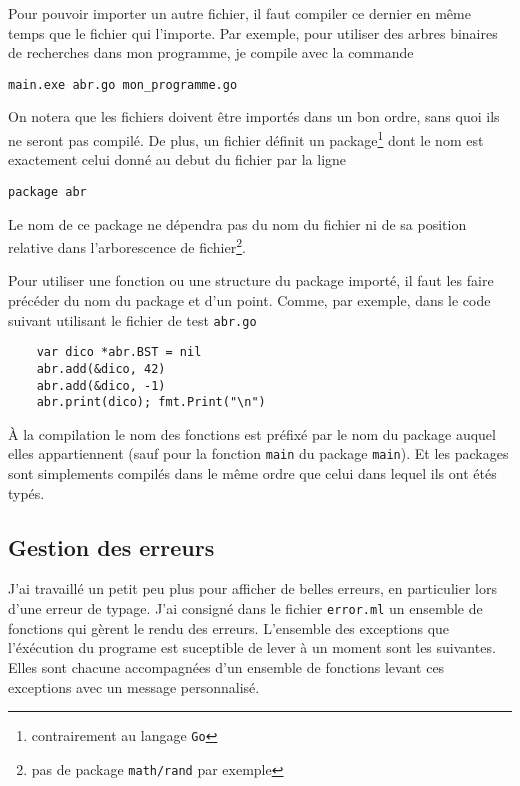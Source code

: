 \documentclass{article}
\begin{document}
Pour pouvoir importer un autre fichier, il faut compiler ce dernier en même temps que le fichier qui l'importe. Par exemple, pour utiliser des arbres binaires de recherches dans mon programme, je compile avec la commande

\begin{verbatim}
main.exe abr.go mon_programme.go
\end{verbatim}

On notera que les fichiers doivent être importés dans un bon ordre, sans quoi ils ne seront pas compilé. De plus, un fichier définit un package\footnote{contrairement au langage \texttt{Go}} dont le nom est exactement celui donné au debut du fichier par la ligne

\begin{verbatim}
package abr
\end{verbatim}

Le nom de ce package ne dépendra pas du nom du fichier ni de sa position relative dans l'arborescence de fichier\footnote{pas de package \texttt{math/rand} par exemple}.

Pour utiliser une fonction ou une structure du package importé, il faut les faire précéder du nom du package et d'un point. Comme, par exemple, dans le code suivant utilisant le fichier de test \texttt{abr.go}

\begin{verbatim}
    var dico *abr.BST = nil
    abr.add(&dico, 42)
    abr.add(&dico, -1)
    abr.print(dico); fmt.Print("\n")
\end{verbatim}

À la compilation le nom des fonctions est préfixé par le nom du package auquel elles appartiennent (sauf pour la fonction \texttt{main} du package \texttt{main}). Et les packages sont simplements compilés dans le même ordre que celui dans lequel ils ont étés typés.

\subsection{Gestion des erreurs\label{sec:errors}}

J'ai travaillé un petit peu plus pour afficher de belles erreurs, en particulier lors d'une erreur de typage. J'ai consigné dans le fichier \texttt{error.ml} un ensemble de fonctions qui gèrent le rendu des erreurs. L'ensemble des exceptions que l'éxécution du programe est suceptible de lever à un moment sont les suivantes. Elles sont chacune accompagnées d'un ensemble de fonctions levant ces exceptions avec un message personnalisé.
\end{document}
